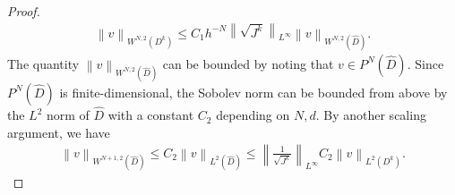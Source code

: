 \documentclass[preprint,10pt]{article}
\theoremstyle{definition}
\theoremstyle{lemma}
\theoremstyle{theorem}
\theoremstyle{assumption}
\renewcommand{\hat}{\widehat}
\newcommand{\nor}[1]{\left\| #1 \right\|}
\newcommand{\LRp}[1]{\left( #1 \right)}
\begin{document}
{\begin{proof}
\begin{align}
\nor{v}_{W^{N,2}\LRp{D^k}}  \leq C_1 h^{-N} \nor{\sqrt{J^k}}_{L^{\infty}} \nor{v}_{W^{N,2}\LRp{\hat{D}}}.  
\end{align}
The quantity $\nor{v}_{W^{N,2}\LRp{\hat{D}}}$ can be bounded by noting that $v\in P^N\LRp{\hat{D}}$.  Since $P^N\LRp{\hat{D}}$ is finite-dimensional, the Sobolev norm can be bounded from above by the $L^2$ norm of $\hat{D}$ with a constant $C_{2}$ depending on $N, d$.  By another scaling argument, we have 
\begin{align}
\nor{v}_{W^{N+1,2}\LRp{\hat{D}}} \leq C_{2} \nor{v}_{L^2\LRp{\hat{D}}} \leq \nor{\frac{1}{\sqrt{J^k}}}_{L^{\infty}} C_{2}  \nor{v}_{L^2\LRp{D^k}}.
\end{align}
\end{proof}

}
\end{document}
